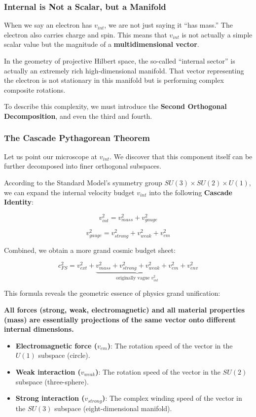 \subsubsection{Internal is Not a Scalar, but a Manifold}

When we say an electron has $v_{int}$, we are not just saying it ``has mass.'' The electron also carries charge and spin. This means that $v_{int}$ is not actually a simple scalar value but the magnitude of a \textbf{multidimensional vector}.

In the geometry of projective Hilbert space, the so-called ``internal sector'' is actually an extremely rich high-dimensional manifold. That vector representing the electron is not stationary in this manifold but is performing complex composite rotations.

To describe this complexity, we must introduce the \textbf{Second Orthogonal Decomposition}, and even the third and fourth.

\subsubsection{The Cascade Pythagorean Theorem}

Let us point our microscope at $v_{int}$. We discover that this component itself can be further decomposed into finer orthogonal subspaces.

According to the Standard Model's symmetry group $SU(3) \times SU(2) \times U(1)$, we can expand the internal velocity budget $v_{int}$ into the following \textbf{Cascade Identity}:

\[v_{int}^2 = v_{mass}^2 + v_{gauge}^2\]

\[v_{gauge}^2 = v_{strong}^2 + v_{weak}^2 + v_{em}^2\]

Combined, we obtain a more grand cosmic budget sheet:

\[c_{FS}^2 = v_{ext}^2 + \underbrace{v_{mass}^2 + v_{strong}^2 + v_{weak}^2 + v_{em}^2}_{\text{originally vague } v_{int}^2} + v_{env}^2\]

This formula reveals the geometric essence of physics grand unification:

\textbf{All forces (strong, weak, electromagnetic) and all material properties (mass) are essentially projections of the same vector onto different internal dimensions.}

\begin{itemize}
\item \textbf{Electromagnetic force ($v_{em}$)}: The rotation speed of the vector in the $U(1)$ subspace (circle).

\item \textbf{Weak interaction ($v_{weak}$)}: The rotation speed of the vector in the $SU(2)$ subspace (three-sphere).

\item \textbf{Strong interaction ($v_{strong}$)}: The complex winding speed of the vector in the $SU(3)$ subspace (eight-dimensional manifold).
\end{itemize}


